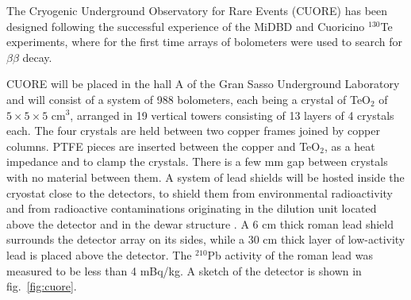 The Cryogenic Underground Observatory for Rare Events (CUORE) \cite{Ardito:2005ar}
has been designed following the successful experience of the  MiDBD \cite{Arnaboldi:2002te} and Cuoricino \cite{Andreotti:2010vj} $^{130}$Te experiments, where for the first time arrays of bolometers were used to search for $\beta\beta$ decay.

CUORE will be placed in the hall A of the Gran Sasso Underground Laboratory and will consist of a system of 988 bolometers, each being a crystal of TeO$_2$ of $5\times5\times5$ cm$^3$, arranged in 19 vertical towers consisting of 13 layers of 4 crystals each. The four crystals are held between two copper frames joined by copper columns. PTFE pieces are inserted between the copper and TeO$_2$, as a heat impedance and to clamp the crystals. There is a few mm gap between crystals with no material between them.
A system of lead shields will be hosted inside the cryostat close to the detectors, to shield them from environmental radioactivity and from radioactive contaminations originating in the dilution unit located above the detector and in the dewar structure \cite{Bellini:2007zz}. A 6 cm thick roman lead shield surrounds the detector array on its sides, while a 30 cm thick layer of low-activity lead is placed above the detector. The $^{210}$Pb activity of the roman lead was measured to be less than 4 mBq/kg. A sketch of the detector is shown in fig.~\ref{fig:cuore}.

